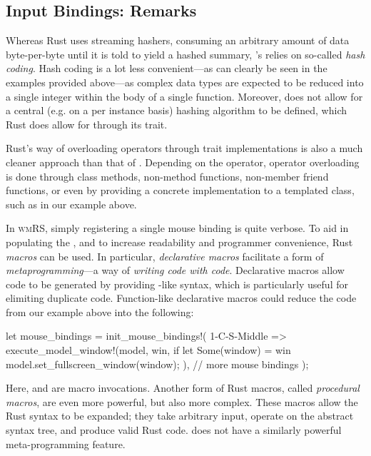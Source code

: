 
\subsection{Input Bindings: Remarks}

Whereas Rust uses streaming hashers, consuming an arbitrary amount of
data byte-per-byte until it is told to yield a hashed summary, \cpp{}'s
 relies on so-called \textit{hash
coding}\cite{buildingahashmap}. Hash coding is a lot less convenient---as
can clearly be seen in the examples provided above---as complex data types
are expected to be reduced into a single integer within the body of a single
function\cite{buildingahashmap}. Moreover, \cpp does not allow for a central
(e.g. on a per  instance basis) hashing algorithm to be defined,
which Rust does allow for through its  trait\cite{therustbook,
therustreference}.

Rust's way of overloading operators through trait implementations is also
a much cleaner approach than that of \cpp. Depending on the operator, \cpp
operator overloading is done through class methods, non-method functions,
non-member friend functions, or even by providing a concrete implementation to
a templated class, such as in our 
example above\cite{cppstd}.


In \textsc{wmRS}, simply registering a single mouse binding is quite verbose.
To aid in populating the , and to increase readability and
programmer convenience, Rust \textit{macros} can be used. In particular,
\textit{declarative macros} facilitate a form of \textit{metaprogramming}---a
way of \textit{writing code with code}\cite{therustbook, therustreference,
rustmacros}. Declarative macros allow code to be generated by providing
-like syntax, which is particularly useful for elimiting duplicate
code. Function-like declarative macros could reduce the code from our example
above into the following:

\begin{rustblock}
  let mouse_bindings = init_mouse_bindings!(
    1-C-S-Middle => execute_model_window!(model, win,
      if let Some(window) = win {
        model.set_fullscreen_window(window);
      }
    ),
    // more mouse bindings
  );
\end{rustblock}

Here,  and  are macro
invocations. Another form of Rust macros, called \textit{procedural macros},
are even more powerful, but also more complex\cite{rustmacros}. These macros
allow the Rust syntax to be expanded; they take arbitrary input, operate on the
abstract syntax tree, and produce valid Rust code\cite{rustmacros}. \cpp does
not have a similarly powerful meta-programming feature\cite{cppstd}.

